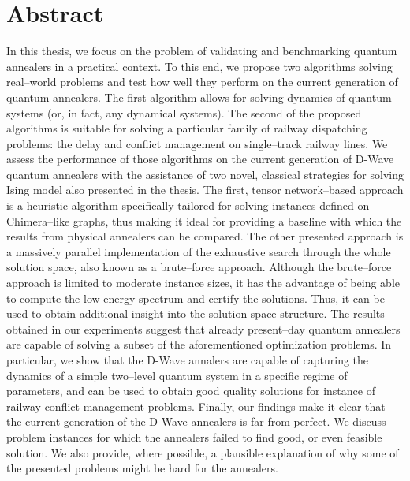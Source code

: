 \chapter*{Abstract}

In this thesis, we focus on the problem of validating and benchmarking quantum annealers in a
practical context. To this end, we propose two algorithms solving real--world problems and test how
well they perform on the current generation of quantum annealers. The first algorithm allows for
solving dynamics of quantum systems (or, in fact, any dynamical systems). The second of the proposed
algorithms is suitable for solving a particular family of railway dispatching problems: the delay
and conflict management on single--track railway lines. We assess the performance of those
algorithms on the current generation of D-Wave quantum annealers with the assistance of two novel,
classical strategies for solving Ising model also presented in the thesis. The first, tensor
network--based approach is a heuristic algorithm specifically tailored for solving instances defined
on Chimera--like graphs, thus making it ideal for providing a baseline with which the results from
physical annealers can be compared. The other presented approach is a massively parallel
implementation of the exhaustive search through the whole solution space, also known as a
brute--force approach. Although the brute--force approach is limited to moderate instance sizes, it
has the advantage of being able to compute the low energy spectrum and certify the solutions. Thus,
it can be used to obtain additional insight into the solution space structure. The results obtained
in our experiments suggest that already present--day quantum annealers are capable of solving a
subset of the aforementioned optimization problems. In particular, we show that the D-Wave annalers
are capable of capturing the dynamics of a simple two--level quantum system in a specific regime of
parameters, and can be used to obtain good quality solutions for instance of railway conflict
management problems. Finally, our findings make it clear that the current generation of the D-Wave
annealers is far from perfect. We discuss problem instances for which the annealers failed to find
good, or even feasible solution. We also provide, where possible, a plausible explanation of why
some of the presented problems might be hard for the annealers.

